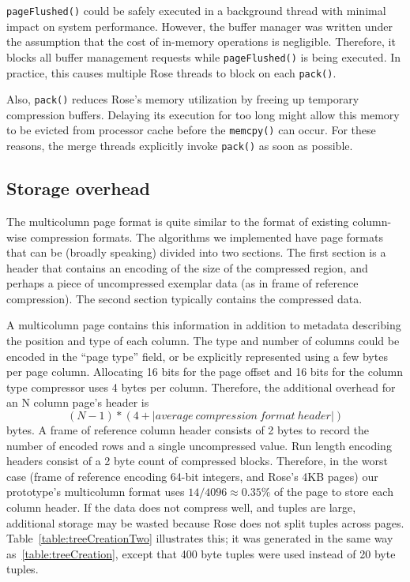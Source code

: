 \documentclass{vldb}
\newcommand{\rows}{Rose\xspace}
\newcommand{\rowss}{Rose's\xspace}
\begin{document}
{\tt pageFlushed()} could be safely executed in a background thread
with minimal impact on system performance.  However, the buffer
manager was written under the assumption that the cost of in-memory
operations is negligible.  Therefore, it blocks all buffer management
requests while {\tt pageFlushed()} is being executed.  In practice,
this causes multiple \rows threads to block on each {\tt pack()}.

Also, {\tt pack()} reduces \rowss memory utilization by freeing up
temporary compression buffers.  Delaying its execution for too long
might allow this memory to be evicted from processor cache before the
{\tt memcpy()} can occur.  For these reasons, the merge threads
explicitly invoke {\tt pack()} as soon as possible.

\subsection{Storage overhead}

The multicolumn page format is quite similar to the format of existing
column-wise compression formats.  The algorithms we implemented have
page formats that can be (broadly speaking) divided into two sections.
The first section is a header that contains an encoding of the size of
the compressed region, and perhaps a piece of uncompressed exemplar
data (as in frame of reference compression).  The second section
typically contains the compressed data.

A multicolumn page contains this information in addition to metadata
describing the position and type of each column.  The type and number
of columns could be encoded in the ``page type'' field, or be
explicitly represented using a few bytes per page column.  Allocating
16 bits for the page offset and 16 bits for the column type compressor
uses 4 bytes per column.  Therefore, the additional overhead for an N
column page's header is
\[
   (N-1) * (4 + |average~compression~format~header|)
\]
bytes.  A frame of reference column header consists of 2 bytes to
record the number of encoded rows and a single uncompressed
value. Run length encoding headers consist of a 2 byte count of
compressed blocks.  Therefore, in the worst case (frame of reference
encoding 64-bit integers, and \rowss 4KB pages) our prototype's
multicolumn format uses $14/4096\approx0.35\%$ of the page to store
each column header.  If the data does not compress well, and tuples
are large, additional storage may be wasted because \rows does not
split tuples across pages.  Table~\ref{table:treeCreationTwo}
illustrates this; it was generated in the same way
as~\ref{table:treeCreation}, except that 400 byte tuples were 
used instead of 20 byte tuples.
\end{document}
